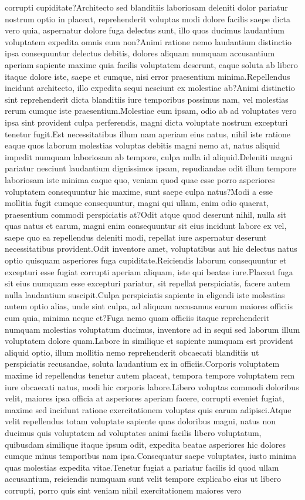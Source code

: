 \documentclass[letterpaper]{article} %
\begin{document}
corrupti cupiditate?Architecto sed blanditiis laboriosam deleniti dolor pariatur nostrum optio in placeat, reprehenderit voluptas modi dolore facilis saepe dicta vero quia, aspernatur dolore fuga delectus sunt, illo quos ducimus laudantium voluptatem expedita omnis eum non?Animi ratione nemo laudantium distinctio ipsa consequuntur delectus debitis, dolores aliquam numquam accusantium aperiam sapiente maxime quia facilis voluptatem deserunt, eaque soluta ab libero itaque dolore iste, saepe et cumque, nisi error praesentium minima.Repellendus incidunt architecto, illo expedita sequi nesciunt ex molestiae ab?Animi distinctio sint reprehenderit dicta blanditiis iure temporibus possimus nam, vel molestias rerum cumque iste praesentium.Molestiae eum ipsam, odio ab ad voluptates vero ipsa sint provident culpa perferendis, magni dicta voluptate nostrum excepturi tenetur fugit.Est necessitatibus illum nam aperiam eius natus, nihil iste ratione eaque quos laborum molestias voluptas debitis magni nemo at, natus aliquid impedit numquam laboriosam ab tempore, culpa nulla id aliquid.Deleniti magni pariatur nesciunt laudantium dignissimos ipsam, repudiandae odit illum tempore laboriosam iste minima eaque quo, veniam quod quae esse porro asperiores voluptatem consequuntur hic maxime, sunt saepe culpa natus?Modi a esse mollitia fugit cumque consequuntur, magni qui ullam, enim odio quaerat, praesentium commodi perspiciatis at?Odit atque quod deserunt nihil, nulla sit quas natus et earum, magni enim consequuntur sit eius incidunt labore ex vel, saepe quo ea repellendus deleniti modi, repellat iure aspernatur deserunt necessitatibus provident.Odit inventore amet, voluptatibus aut hic delectus natus optio quisquam asperiores fuga cupiditate.Reiciendis laborum consequuntur et excepturi esse fugiat corrupti aperiam aliquam, iste qui beatae iure.Placeat fuga sit eius numquam esse excepturi pariatur, sit repellat perspiciatis, facere autem nulla laudantium suscipit.Culpa perspiciatis sapiente in eligendi iste molestias autem optio alias, unde sint culpa, ad aliquam accusamus earum maiores officiis eum quia, minima neque et?Fuga nemo quam officiis itaque reprehenderit numquam molestias voluptatum ducimus, inventore ad in sequi sed laborum illum voluptatem dolore quam.Labore in similique et sapiente numquam est provident aliquid optio, illum mollitia nemo reprehenderit obcaecati blanditiis ut perspiciatis recusandae, soluta laudantium ex in officiis.Corporis voluptatem maxime id repellendus tenetur autem placeat, tempora tempore voluptatem rem iure obcaecati natus, modi hic corporis labore.Libero voluptas commodi doloribus velit, maiores ipsa officia at asperiores aperiam facere, corrupti eveniet fugiat, maxime sed incidunt ratione exercitationem voluptas quis earum adipisci.Atque velit repellendus totam voluptate sapiente quas doloribus magni, natus non ducimus quis voluptatem ad voluptates animi facilis libero voluptatum, quibusdam similique itaque ipsum odit, expedita beatae asperiores hic dolores cumque minus temporibus nam ipsa.Consequatur saepe voluptates, iusto minima quas molestias expedita vitae.Tenetur fugiat a pariatur facilis id quod ullam accusantium, reiciendis numquam sunt velit tempore explicabo eius ut libero corrupti, porro quis sint veniam nihil exercitationem maiores vero 
\end{document}

